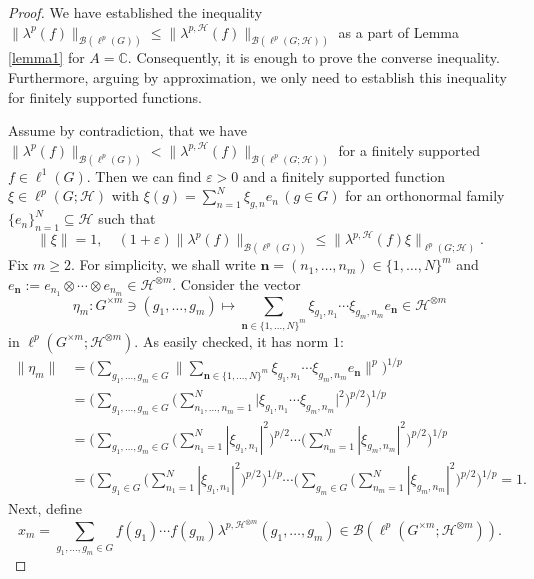 \documentclass[12pt]{amsart}
\theoremstyle{definition}
\theoremstyle{remark}
\numberwithin{equation}{section}
\newcommand{\C}{\mathbb{C}}
\newcommand{\mc}{\mathcal}
\newcommand{\eps}{\varepsilon}
\begin{document}
\begin{proof}
We have established the inequality $\|\lambda^p(f)\|_{\mc{B}(\ell^p(G))}\le
\|\lambda^{p,\mc{H}}(f)\|_{\mc{B}(\ell^p(G;\mc{H}))}$ as a part of Lemma \ref{lemma1} for $A=\C$. Consequently, it is enough to prove the converse inequality. Furthermore, arguing by approximation, we only need to establish this inequality for finitely supported functions.

Assume by contradiction, that we have $\bigl\|\lambda^p(f)\bigr\|_{\mc{B}(\ell^p(G))}< \bigl\|\lambda^{p,\mc{H}}(f) \bigr\|_{\mc{B}(\ell^p(G;\mathcal{H}))}$ for a finitely supported $f\in \ell^1(G)$. Then we can find $\eps>0$ and a finitely supported function $\xi\in \ell^p(G;\mc{H})$ with $\xi(g)=\sum_{n=1}^{N} \xi_{g,n} e_n\,(g\in G)$ for an orthonormal family $\{e_n\}_{n=1}^{N}\subseteq \mathcal{H}$ such that
\begin{equation}\label{eq1}
\|\xi\|=1,\quad (1+ \eps)
\bigl\|\lambda^p(f) \bigr\|_{\mc{B}(\ell^p(G))}\le \bigl\|\lambda^{p,\mc{H}}(f)\xi \bigr\|_{\ell^p(G;\mathcal{H})}.
\end{equation}
Fix $m\geq 2$. For simplicity, we shall write $\mathbf{n}=(n_1,\ldots,n_m)\in \{1,\ldots,N\}^m$ and $e_{\mathbf{n}}:=e_{n_1} \otimes \cdots \otimes  e_{n_m} \in \mathcal{H}^{\otimes m}$. Consider the vector
\[
\eta_m \colon G^{\times m}\ni  (g_1,\dotsc,g_m) \mapsto
\sum_{\mathbf{n} \in \{1,\ldots,N\}^m}
\xi_{g_1,n_1}\cdots \xi_{g_m,n_m}
e_{\mathbf{n}}\in \mc{H}^{\otimes m}
\]
in $\ell^p(G^{\times m};\mathcal{H}^{\otimes m})$. As easily checked, it has norm $1$:
\begin{align*}
\|\eta_m\|&=
\bigl(
\sum_{g_1,\dotsc,g_m\in G}
\bigl\|
\sum_{\mathbf{n} \in \{1,\ldots,N\}^m}
\xi_{g_1,n_1}\cdots \xi_{g_m,n_m}
e_{\mathbf{n}}
\bigr\|^{p}
\bigr)^{1/p}\\
&=
\bigl(
\sum_{g_1,\dotsc,g_m\in G}
\bigl(\sum_{n_1,\dotsc,n_m=1}^{N}
\bigl|
\xi_{g_1,n_1}\cdots \xi_{g_m,n_m}\bigr|^{2}\bigr)^{p/2}
\bigr)^{1/p}\\
&=
\bigl(
\sum_{g_1,\dotsc,g_m\in G}
\bigl(\sum_{n_1=1}^{N}
|\xi_{g_1,n_1}|^{2}\bigr)^{p/2}
\cdots
\bigl(
\sum_{n_m=1}^{N}
|\xi_{g_m,n_m}|^{2}
\bigr)^{p/2}
\bigr)^{1/p}\\
&=
\bigl(
\sum_{g_1\in G}
\bigl(\sum_{n_1=1}^{N}
|\xi_{g_1,n_1}|^{2}\bigr)^{p/2}
\bigr)^{1/p}
\cdots\bigl(\sum_{g_m\in G}
\bigl(
\sum_{n_m=1}^{N}
|\xi_{g_m,n_m}|^{2}
\bigr)^{p/2}
\bigr)^{1/p}=1.
\end{align*}
Next, define
\[
x_m=\sum_{g_1,\dotsc,g_m\in G}
f(g_1)\cdots f(g_m)\lambda^{p,\mathcal{H}^{\otimes m}}(g_1,\dotsc,g_m)\in \mc{B}(\ell^p(G^{\times m};\mathcal{H}^{\otimes m})).
\]
\end{proof}
\end{document}
